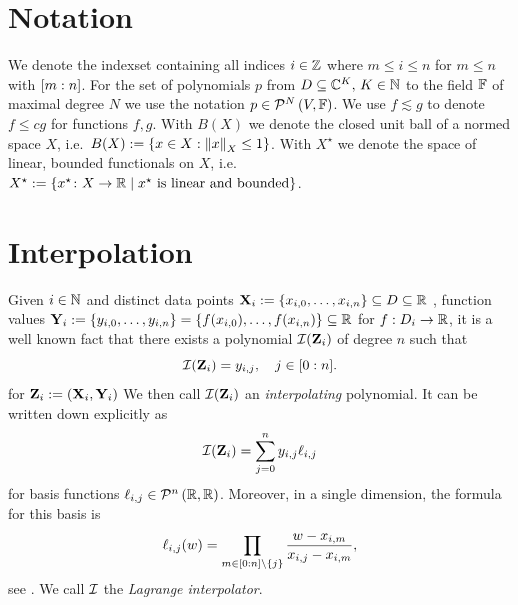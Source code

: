 \documentclass[12pt, oneside]{amsart}
\theoremstyle{definition}
\theoremstyle{remark}
\numberwithin{equation}{section}
\begin{document}
\section{Notation}

We denote the indexset containing all indices $i\in \Z$ 
where $m\leq i\leq n$ for $m\leq n$ with \(\indexset[m]{n}\). For the set of 
polynomials \(p\) from \(D \subseteq \C^K,\, K \in \N\) to the field \(\F\) of maximal 
degree \(N\) we use the notation 
\(p \in \pols[N]{V, \F}\).
We use \(f \lesssim g\) to denote \(f \leq c 
g\) for functions \(f, g\). With \(B(X)\) we denote the closed unit ball of a 
normed space \(X\), %
i.e.\ \(B(X) \defn \set{x \in X: \norm[X]{x} \leq 1}\). With \(X^\star\) we 
denote the space of linear, bounded functionals on \(X\), i.e. \(X^\star \defn 
\set{x^\star\from X \to \R \mid x^\star \text{ is linear and bounded}}\).
\newpage
\section{Interpolation}

Given \(i \in \N\) and distinct data points \(\XX_i \defn \set{x_{i, 0}, \dots, 
x_{i, n}} \subseteq D \subseteq \R\) , function values 
\(\YY_i \defn \set{y_{i, 0}, \dots, y_{i, n}} = \set{f(x_{i, 0}), \dots, 
f(x_{i, n})} \subseteq \R\) for \(f: D_i \to \R\), it is a well known fact that 
there exists a polynomial \(\cI(\ZZ_i)\) of degree \(n\) such that \[
    \cI(\ZZ_i) = y_{i, j},\quad j \in \indexset[0]{n}.
\]
for \(\ZZ_i \defn (\XX_i, \YY_i)\)
We then call \(\cI(\ZZ_i)\) an \emph{interpolating} polynomial. It can be written down explicitly as \begin{equation}\label{interpolating_polynomial}
    \cI(\ZZ_i) = \sum_{j=0}^n y_{i, j} \ell_{i, j}
\end{equation}
for basis functions \(\ell_{i, j} \in \pols[n]{\R, \R}\). Moreover, in a single 
dimension, the formula for this basis is
\[
\ell_{i, j}(w) = \prod_{m \in \indexset[0]{n} \setminus \set{j}} \frac{w-x_{i, 
m}}{x_{i, j}-x_{i, m}},
\]
see \cite{waring1779, lagrange1901}. We call \(\cI\) the 
\emph{Lagrange interpolator}.
\end{document}
